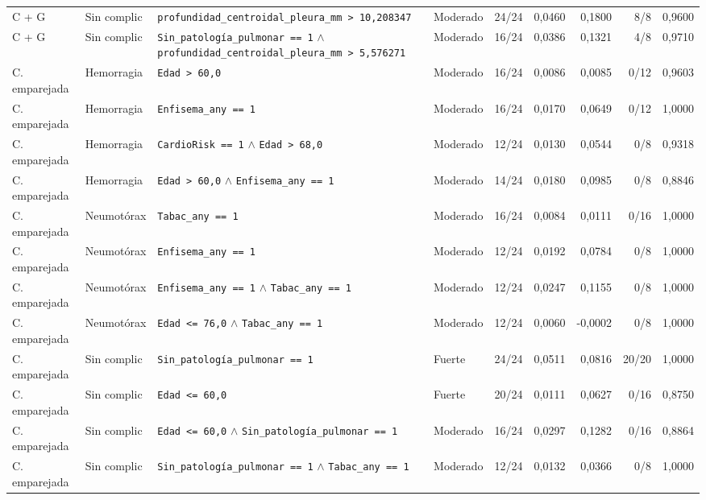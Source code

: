 \begin{landscape}
\begin{longtable}{p{2.1cm}p{1.5cm}p{6.0cm}p{1.5cm}rrrrr}
C + G & Sin complic & \texttt{profundidad\_centroidal\_pleura\_mm > 10,208347} & Moderado & 24/24 & 0,0460 & 0,1800 & 8/8 & 0,9600 \\

C + G & Sin complic & \texttt{Sin\_patología\_pulmonar == 1} \(\land\) \texttt{profundidad\_centroidal\_pleura\_mm > 5,576271} & Moderado & 16/24 & 0,0386 & 0,1321 & 4/8 & 0,9710 \\

C. emparejada & Hemorragia & \texttt{Edad > 60,0} & Moderado & 16/24 & 0,0086 & 0,0085 & 0/12 & 0,9603 \\

C. emparejada & Hemorragia & \texttt{Enfisema\_any == 1} & Moderado & 16/24 & 0,0170 & 0,0649 & 0/12 & 1,0000 \\

C. emparejada & Hemorragia & \texttt{CardioRisk == 1} \(\land\) \texttt{Edad > 68,0} & Moderado & 12/24 & 0,0130 & 0,0544 & 0/8 & 0,9318 \\

C. emparejada & Hemorragia & \texttt{Edad > 60,0} \(\land\) \texttt{Enfisema\_any == 1} & Moderado & 14/24 & 0,0180 & 0,0985 & 0/8 & 0,8846 \\

C. emparejada & Neumotórax & \texttt{Tabac\_any == 1} & Moderado & 16/24 & 0,0084 & 0,0111 & 0/16 & 1,0000 \\

C. emparejada & Neumotórax & \texttt{Enfisema\_any == 1} & Moderado & 12/24 & 0,0192 & 0,0784 & 0/8 & 1,0000 \\

C. emparejada & Neumotórax & \texttt{Enfisema\_any == 1} \(\land\) \texttt{Tabac\_any == 1} & Moderado & 12/24 & 0,0247 & 0,1155 & 0/8 & 1,0000 \\

C. emparejada & Neumotórax & \texttt{Edad <= 76,0} \(\land\) \texttt{Tabac\_any == 1} & Moderado & 12/24 & 0,0060 & -0,0002 & 0/8 & 1,0000 \\

C. emparejada & Sin complic & \texttt{Sin\_patología\_pulmonar == 1} & Fuerte & 24/24 & 0,0511 & 0,0816 & 20/20 & 1,0000 \\

C. emparejada & Sin complic & \texttt{Edad <= 60,0} & Fuerte & 20/24 & 0,0111 & 0,0627 & 0/16 & 0,8750 \\

C. emparejada & Sin complic & \texttt{Edad <= 60,0} \(\land\) \texttt{Sin\_patología\_pulmonar == 1} & Moderado & 16/24 & 0,0297 & 0,1282 & 0/16 & 0,8864 \\

C. emparejada & Sin complic & \texttt{Sin\_patología\_pulmonar == 1} \(\land\) \texttt{Tabac\_any == 1} & Moderado & 12/24 & 0,0132 & 0,0366 & 0/8 & 1,0000 \\

\end{longtable}
\end{landscape}
